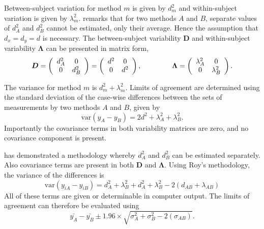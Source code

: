 \documentclass[12pt, a4paper]{report}
\theoremstyle{plain}
\theoremstyle{definition}
\theoremstyle{remark}
\begin{document}
Between-subject variation for method $m$ is given by $d^2_{m}$ and within-subject variation is given by $\lambda^2_{m}$.  \citet{BXC2008} remarks that for two methods $A$ and $B$, separate values of $d^2_{A}$ and $d^2_{B}$ cannot be estimated, only their average. Hence the assumption that $d_{x}= d_{y}= d$ is necessary. The between-subject variability $\boldsymbol{D}$ and within-subject variability $\boldsymbol{\Lambda}$ can be presented in matrix form,\[
\boldsymbol{D} = \left(%
\begin{array}{cc}
d^2_{A}& 0 \\
0 & d^2_{B} \\
\end{array}%
\right)=\left(%
\begin{array}{cc}
d^2& 0 \\
0 & d^2\\
\end{array}%
\right),
\hspace{1.5cm}
\boldsymbol{\Lambda} = \left(%
\begin{array}{cc}
\lambda^2_{A}& 0 \\
0 & \lambda^2_{B} \\
\end{array}%
\right).
\]

The variance for method $m$ is $d^2_{m}+\lambda^2_{m}$. Limits of agreement are determined using the standard deviation of the case-wise differences between the sets of measurements by two methods $A$ and $B$, given by
\begin{equation}
\mbox{var} (y_{A}-y_{B}) = 2d^2 + \lambda^2_{A}+ \lambda^2_{B}.
\end{equation}
Importantly the covariance terms in both variability matrices are zero, and no covariance component is present.


\citet{roy} has demonstrated a methodology whereby $d^2_{A}$ and $d^2_{B}$ can be estimated separately. Also covariance terms are present in both $\boldsymbol{D}$ and $\boldsymbol{\Lambda}$. Using Roy's methodology, the variance of the differences is
\begin{equation}
\mbox{var} (y_{iA}-y_{iB})= d^2_{A} + \lambda^2_{B} + d^2_{A} + \lambda^2_{B} - 2(d_{AB} + \lambda_{AB})
\end{equation}
All of these terms are given or determinable in computer output.
The limits of agreement can therefore be evaluated using
\begin{equation}
\bar{y_{A}}-\bar{y_{B}} \pm 1.96 \times \sqrt{ \sigma^2_{A} + \sigma^2_{B}  - 2(\sigma_{AB})}.
\end{equation}
\end{document}
